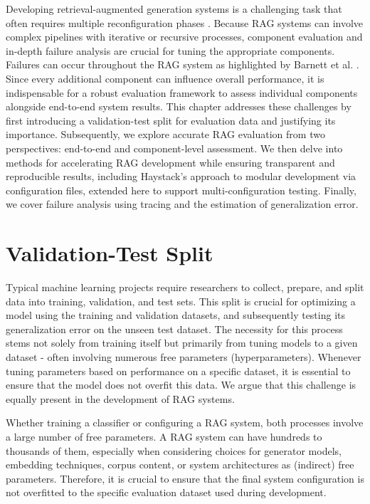 Developing retrieval-augmented generation systems is a challenging task that often requires multiple reconfiguration phases \cite{Simon.10112024}. Because RAG systems can involve complex pipelines with iterative or recursive processes, component evaluation and in-depth failure analysis are crucial for tuning the appropriate components. Failures can occur throughout the RAG system as highlighted by Barnett et al. \cite{Barnett.2024}. Since every additional component can influence overall performance, it is indispensable for a robust evaluation framework to assess individual components alongside end-to-end system results. This chapter addresses these challenges by first introducing a validation-test split for evaluation data and justifying its importance. Subsequently, we explore accurate RAG evaluation from two perspectives: end-to-end and component-level assessment. We then delve into methods for accelerating RAG development while ensuring transparent and reproducible results, including Haystack's approach to modular development via configuration files, extended here to support multi-configuration testing. Finally, we cover failure analysis using tracing and the estimation of generalization error.

\section{Validation-Test Split}\label{sec:valtestsplit}
Typical machine learning projects require researchers to collect, prepare, and split data into training, validation, and test sets. This split is crucial for optimizing a model using the training and validation datasets, and subsequently testing its generalization error on the unseen test dataset. The necessity for this process stems not solely from training itself but primarily from tuning models to a given dataset - often involving numerous free parameters (hyperparameters). Whenever tuning parameters based on performance on a specific dataset, it is essential to ensure that the model does not overfit this data. We argue that this challenge is equally present in the development of RAG systems.

Whether training a classifier or configuring a RAG system, both processes involve a large number of free parameters. A RAG system can have hundreds to thousands of them, especially when considering choices for generator models, embedding techniques, corpus content, or system architectures as (indirect) free parameters. Therefore, it is crucial to ensure that the final system configuration is not overfitted to the specific evaluation dataset used during development.

